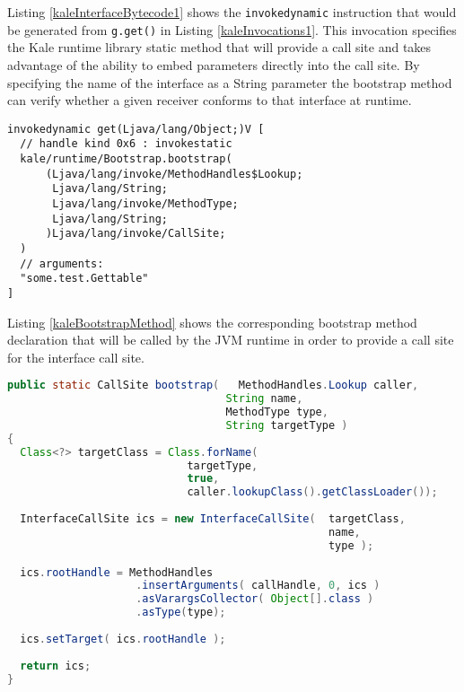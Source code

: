 Listing \ref{kaleInterfaceBytecode1} shows the \texttt{invokedynamic} instruction that would be generated from \texttt{g.get()} in Listing \ref{kaleInvocations1}.  This invocation specifies the Kale runtime library static method that will provide a call site and takes advantage of the ability to embed parameters directly into the call site.  By specifying the name of the interface as a String parameter the bootstrap method can verify whether a given receiver conforms to that interface at runtime.

\begin{lstlisting}[language=jvm-bytecode,caption=invokedynamic interface call site,label=kaleInterfaceBytecode1]
invokedynamic get(Ljava/lang/Object;)V [
  // handle kind 0x6 : invokestatic
  kale/runtime/Bootstrap.bootstrap(
      (Ljava/lang/invoke/MethodHandles$Lookup;
       Ljava/lang/String;
       Ljava/lang/invoke/MethodType;
       Ljava/lang/String;
      )Ljava/lang/invoke/CallSite;
  )
  // arguments:
  "some.test.Gettable"
]
\end{lstlisting}

Listing \ref{kaleBootstrapMethod} shows the corresponding bootstrap method declaration that will be called by the JVM runtime in order to provide a call site for the interface call site.

\begin{lstlisting}[language=Java,caption=Interface call site runtime bootstrap method,label=kaleBootstrapMethod]
public static CallSite bootstrap(	MethodHandles.Lookup caller,
                                  String name,
                                  MethodType type,
                                  String targetType )
{
  Class<?> targetClass = Class.forName(	
                            targetType,
                            true,
                            caller.lookupClass().getClassLoader());
                
  InterfaceCallSite ics = new InterfaceCallSite(  targetClass,
                                                  name,
                                                  type );
  
  ics.rootHandle = MethodHandles
                    .insertArguments( callHandle, 0, ics )
                    .asVarargsCollector( Object[].class )
                    .asType(type);
		
  ics.setTarget( ics.rootHandle );
  
  return ics;
}
\end{lstlisting}

